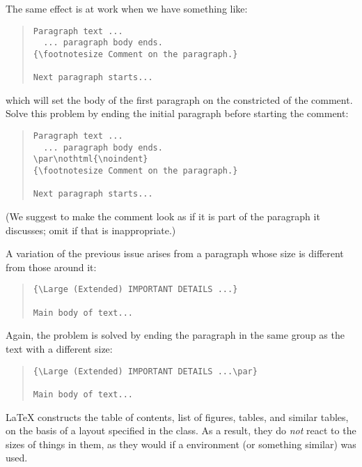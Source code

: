 The same effect is at work when we have something like:
\begin{quote}
\begin{verbatim}
Paragraph text ...
  ... paragraph body ends.
{\footnotesize Comment on the paragraph.}

Next paragraph starts...
\end{verbatim}
\end{quote}
which will set the body of the first paragraph on the constricted
 of the  comment.  Solve this
problem by ending the initial paragraph before starting the comment:
\begin{quote}
\begin{verbatim}
Paragraph text ...
  ... paragraph body ends.
\par\nothtml{\noindent}
{\footnotesize Comment on the paragraph.}

Next paragraph starts...
\end{verbatim}
\end{quote}
(We suggest  to make the comment look as if it is part
of the paragraph it discusses; omit  if that is inappropriate.)

A variation of the previous issue arises from a paragraph whose size
is different from those around it:
\begin{quote}
\begin{verbatim}
{\Large (Extended) IMPORTANT DETAILS ...}

Main body of text...
\end{verbatim}
\end{quote}
Again, the problem is solved by ending the paragraph in the same group
as the text with a different size:
\begin{quote}
\begin{verbatim}
{\Large (Extended) IMPORTANT DETAILS ...\par}

Main body of text...
\end{verbatim}
\end{quote}


\LaTeX{} constructs the table of contents, list of figures, tables,
and similar tables, on the basis of a layout specified in the class.
As a result, they do \emph{not} react to the sizes of things in them,
as they would if a  environment (or something
similar) was used.

